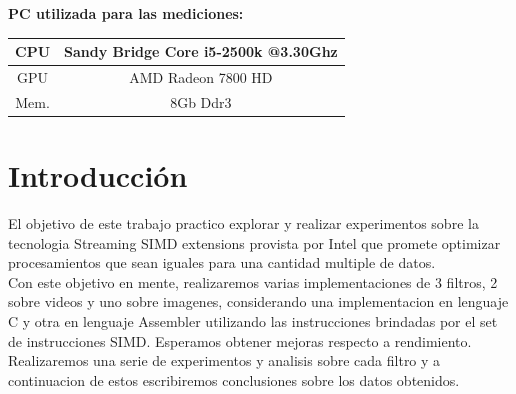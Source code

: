 \documentclass[a4paper,10pt,twoside]{article}
\begin{document}
\begin{center}
\vspace{1cm}

\textbf{PC utilizada para las mediciones:} \\
\vspace{0.cm}
\begin{tabular}{|c|c|}
    \hline
    CPU &   Sandy Bridge Core i5-2500k @3.30Ghz\\
    \hline
    GPU & AMD Radeon 7800 HD\\
    \hline
    Mem.    &   8Gb Ddr3    \\
    \hline
\end{tabular}

\end{center}

\newpage




\tableofcontents

\newpage




\section{Introducción}
El objetivo de este trabajo practico explorar y realizar experimentos sobre la tecnologia Streaming SIMD extensions provista por Intel que promete optimizar procesamientos que sean iguales para una cantidad multiple de datos.\\
Con este objetivo en mente, realizaremos varias implementaciones de 3 filtros, 2 sobre videos y uno sobre imagenes, considerando una implementacion en lenguaje C y otra en lenguaje Assembler utilizando las instrucciones brindadas por el set de instrucciones SIMD. Esperamos obtener mejoras respecto a rendimiento. Realizaremos una serie de experimentos y analisis sobre cada filtro y a continuacion de estos escribiremos conclusiones sobre los datos obtenidos.


\end{document}

